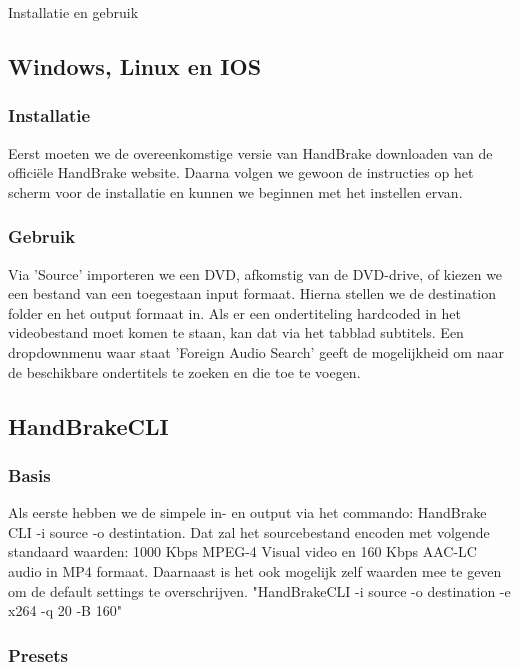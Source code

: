 \label{Hoofdstuk 3}

\begin{sectionbox}{Installatie en gebruik}\end{sectionbox}

\subsection{Windows, Linux en IOS}

\subsubsection{Installatie}

Eerst moeten we de overeenkomstige versie van HandBrake downloaden van de officiële HandBrake website\cite{Download}. Daarna volgen we gewoon de instructies op het scherm voor de installatie en kunnen we beginnen met het instellen ervan.

\subsubsection{Gebruik}

Via 'Source' importeren we een DVD, afkomstig van de DVD-drive, of kiezen we een bestand van een toegestaan input formaat. Hierna stellen we de destination folder en het output formaat in. Als er een ondertiteling hardcoded in het videobestand moet komen te staan, kan dat via het tabblad subtitels. Een dropdownmenu waar staat 'Foreign Audio Search' geeft de mogelijkheid om naar de beschikbare ondertitels te zoeken en die toe te voegen.

\subsection{HandBrakeCLI}
\subsubsection{Basis}

Als eerste hebben we de simpele in- en output via het commando: HandBrake CLI -i source -o destintation. Dat zal het sourcebestand encoden met volgende standaard waarden: 1000 Kbps MPEG-4 Visual video en 160 Kbps AAC-LC audio in MP4 formaat.
Daarnaast is het ook mogelijk zelf waarden mee te geven om de default settings te overschrijven. "HandBrakeCLI -i source -o destination -e x264 -q 20 -B 160"

\subsubsection{Presets}


